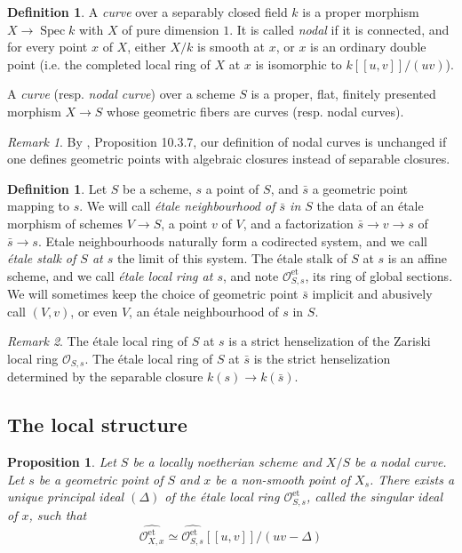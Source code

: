 \documentclass[a4paper,10pt,twoside]{article}
\newcommand{\ra}{\rightarrow}
\newcommand{\on}[1]{\operatorname{#1}}
\renewcommand{\O}{\mathcal{O}}
\DeclareMathOperator{\spec}{Spec}
\newtheorem{prop}[thm]{Proposition}
\theoremstyle{definition}
\newtheorem{defi}[thm]{Definition}
\theoremstyle{remark}
\newtheorem{rem}{Remark}[thm]
\renewcommand{\on}[1]{\operatorname{#1}}
\begin{document}
\begin{defi}\label{definition des courbes nodals et points etales}
A \emph{curve} over a separably closed field $k$ is a proper morphism $X\ra\spec k$ with $X$ of pure dimension $1$. It is called \emph{nodal} if it is connected, and for every point $x$ of $X$, either $X/k$ is smooth at $x$, or $x$ is an ordinary double point (i.e. the completed local ring of $X$ at $x$ is isomorphic to $k[[u,v]]/(uv)$).

A \emph{curve} (resp. \emph{nodal curve}) over a scheme $S$ is a proper, flat, finitely presented morphism $X\ra S$ whose geometric fibers are curves (resp. nodal curves).
\end{defi}


\begin{rem}
By \cite{Liu}, Proposition 10.3.7, our definition of nodal curves is unchanged if one defines geometric points with algebraic closures instead of separable closures.
\end{rem}

\begin{defi}
Let $S$ be a scheme, $s$ a point of $S$, and $\bar s$ a geometric point mapping to $s$. We will call \emph{\'etale neighbourhood of $\bar s$ in $S$} the data of an \'etale morphism of schemes $V \to S$, a point $v$ of $V$, and a factorization $\bar s \to v \to s$ of $\bar s \to s$. Etale neighbourhoods naturally form a codirected system, and we call \emph{\'etale stalk of $S$ at $s$} the limit of this system. The \'etale stalk of $S$ at $s$ is an affine scheme, and we call \emph{\'etale local ring at $s$}, and note $\O_{S,s}^{\on{et}}$, its ring of global sections. We will sometimes keep the choice of geometric point $\bar s$ implicit and abusively call $(V,v)$, or even $V$, an \'etale neighbourhood of $s$ in $S$.
\end{defi}

\begin{rem}
The \'etale local ring of $S$ at $s$ is a strict henselization of the Zariski local ring $\O_{S,s}$. The \'etale local ring of $S$ at $\bar s$ is the strict henselization determined by the separable closure $k(s) \to k(\bar s)$.
\end{rem}

\subsection{The local structure}

\begin{prop}\label{structure locale des courbes nodals}
Let $S$ be a locally noetherian scheme and $X/S$ be a nodal curve. Let $s$ be a geometric point of $S$ and $x$ be a non-smooth point of $X_s$. There exists a unique principal ideal $(\Delta)$ of the étale local ring $\O^{\on{et}}_{S,s}$, called the \emph{singular ideal of $x$}, such that
\[
\widehat{\O^{\on{et}}_{X,x}}\simeq\widehat{\O^{\on{et}}_{S,s}}[[u,v]]/(uv-\Delta)
\]
\end{prop}
\end{document}
